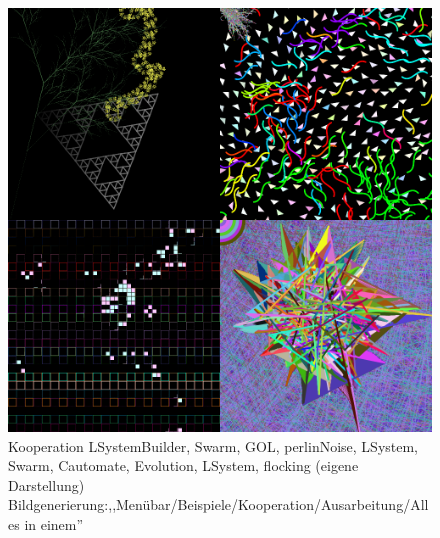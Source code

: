 \documentclass[../mciAusarbeitung.tex]{subfiles}
\begin{document}
		\begin{figure}[H]
			\centering
			\includegraphics[width=\linewidth]{img/allesInEinem.png}
			\caption[Alles in einem]{Kooperation LSystemBuilder, Swarm, GOL, perlinNoise, LSystem, Swarm, Cautomate, Evolution, LSystem, flocking (eigene Darstellung)\\
			Bildgenerierung:,,Menübar/Beispiele/Kooperation/Ausarbeitung/Alles in einem''}
		\end{figure}
	
\end{document}
